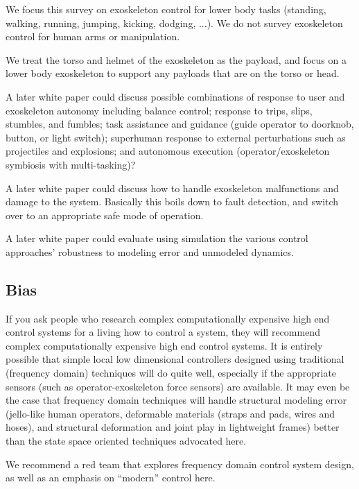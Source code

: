 \documentclass[letterpaper,12pt,fullpage]{article}
\begin{document}
We focus this survey on exoskeleton control for lower body tasks (standing, walking,
running, jumping, kicking, dodging, ...).
We do not survey exoskeleton control for human arms or manipulation. 

We treat the torso and helmet of the exoskeleton as the payload,
and focus on a lower body exoskeleton to support any payloads that
are on the torso or head.

A later white paper could discuss
possible combinations of response to user and exoskeleton
autonomy including balance control; response to trips, slips,
stumbles, and fumbles; task assistance and guidance (guide operator to
doorknob, button, or light switch); superhuman response to external
perturbations such as projectiles and explosions; and autonomous
execution (operator/exoskeleton symbiosis with multi-tasking)?

A later white paper could discuss how to handle exoskeleton
malfunctions and damage to the
system. Basically this boils down to fault detection, and switch over to
an appropriate safe mode of operation.

A later white paper could evaluate using simulation
the various control approaches' robustness to modeling error and unmodeled
dynamics.

\subsection{Bias}

If you ask people who research complex computationally expensive
high end control
systems for a living how to control a system,
they will recommend complex computationally expensive high end control systems.
It is entirely possible that simple local low dimensional controllers
designed using traditional (frequency domain) techniques will do
quite well, especially if the appropriate sensors (such as 
operator-exoskeleton force sensors) are available.
It may even be the case that frequency domain techniques will handle
structural modeling error (jello-like human operators, deformable materials
(straps and pads, wires and hoses), and structural deformation and joint
play in lightweight frames) better than the state space oriented techniques
advocated here.

We recommend a red team that explores frequency domain control system
design, as well as an emphasis on ``modern'' control here.
\end{document}
